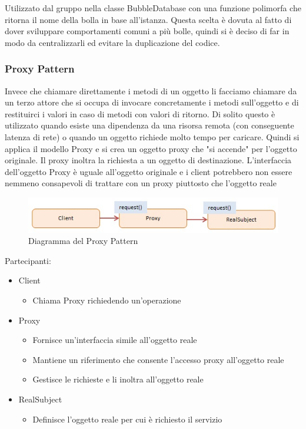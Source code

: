 Utilizzato dal gruppo nella classe BubbleDatabase con una funzione polimorfa che ritorna il nome della bolla in base all'istanza.
Questa scelta è dovuta al fatto di dover sviluppare comportamenti comuni a più bolle, quindi si è deciso di far in modo da centralizzarli ed evitare la duplicazione del codice.

\subsubsection{Proxy Pattern}
Invece che chiamare direttamente i metodi di un oggetto li facciamo chiamare da un terzo attore che si occupa di invocare concretamente i metodi sull'oggetto e di restituirci i valori in caso di metodi con valori di ritorno. 
Di solito questo è utilizzato quando esiste una dipendenza da una risorsa remota (con conseguente latenza di rete) o quando un oggetto richiede molto tempo per caricare.
Quindi si applica il modello Proxy e si crea un oggetto proxy che "si
accende" per l'oggetto originale. Il proxy inoltra la richiesta a un
oggetto di destinazione. L'interfaccia dell'oggetto Proxy è uguale
all'oggetto originale e i client potrebbero non essere nemmeno
consapevoli di trattare con un proxy piuttosto che l'oggetto reale 

	\FloatBarrier
	\begin{figure}[ht]
		\centering
		\includegraphics[scale=0.45]{img/javascript-proxy.jpg}
		\caption{Diagramma del Proxy Pattern}
	\end{figure}
	
	Partecipanti:
	\begin{itemize}
		\item Client
			\begin{itemize}
				\item Chiama Proxy richiedendo un'operazione
			\end{itemize}
		\item Proxy
			\begin{itemize}
				\item Fornisce un'interfaccia simile all'oggetto reale
				\item Mantiene un riferimento che consente l'accesso proxy all'oggetto reale
				\item Gestisce le richieste e li inoltra all'oggetto reale
			\end{itemize}
		\item RealSubject
			\begin{itemize}
				\item Definisce l'oggetto reale per cui è richiesto il servizio
			\end{itemize}
	\end{itemize}

